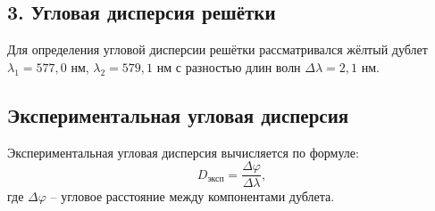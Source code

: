 \documentclass[12pt,a4paper]{article}
\begin{document}
\vspace{0.4cm}

















\subsection*{3. Угловая дисперсия решётки}

Для определения угловой дисперсии решётки рассматривался жёлтый дублет $\lambda_1 = 577{,}0$ нм, $\lambda_2 = 579{,}1$ нм с разностью длин волн $\Delta\lambda = 2{,}1$ нм.

\subsection*{Экспериментальная угловая дисперсия}

Экспериментальная угловая дисперсия вычисляется по формуле:
\begin{equation}
    D_{\text{эксп}} = \frac{\Delta\varphi}{\Delta\lambda},
\end{equation}
где $\Delta\varphi$ -- угловое расстояние между компонентами дублета.
\end{document}

